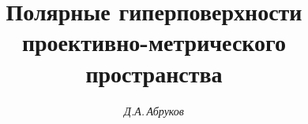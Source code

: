 

 


%


 


\newcommand{\eqdef}{\overset{\mathrm{def}}{=}{}} 


\newcommand{\const}{\operatorname{const}} 


\newcommand{\tts}[1]{} 


 




\setcounter{page}{3} 












 


\author{\it Д.А.\,Абруков} 




\title{Полярные гиперповерхности \\ 


проективно-метрического пространства} 


 


\date{} 




\pagestyle{plain} %


 




\maketitle 


